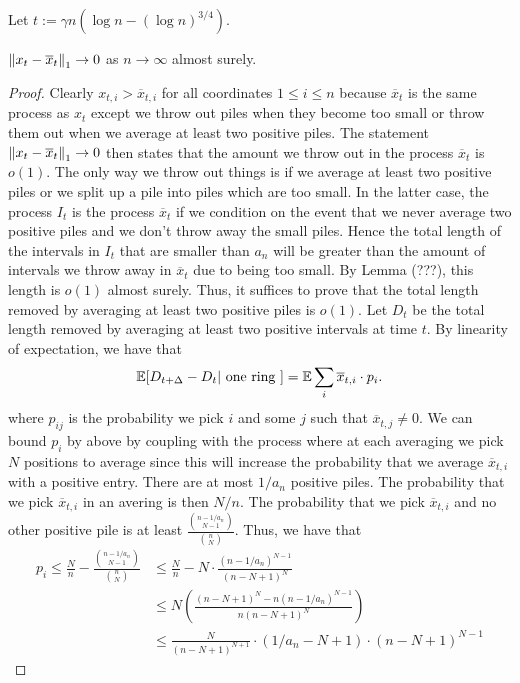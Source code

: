 \documentclass[12pt]{article}
\begin{document}
Let $t := \gamma n (\log n - (\log n)^{3/4})$. 
\begin{lem}
	$\left\lVert x_t - \overline{x}_t \right\rVert_1 \to 0$ as $n \to \infty$ almost surely. 
\end{lem}

\begin{proof}
	Clearly $x_{t, i} > \overline{x}_{t, i}$ for all coordinates $1 \leq i \leq n$ because $\overline{x}_{t}$ is the same process as $x_t$ except we throw out piles when they become too small or throw them out when we average at least two positive piles. The statement $\left\lVert x_t - \overline{x}_t \right\rVert_1 \to 0$ then states that the amount we throw out in the process $\overline{x}_t$ is $o(1)$. The only way we throw out things is if we average at least two positive piles or we split up a pile into piles which are too small. In the latter case, the process $I_t$ is the process $\overline{x}_t$ if we condition on the event that we never average two positive piles and we don't throw away the small piles. Hence the total length of the intervals in $I_t$ that are smaller than $a_n$ will be greater than the amount of intervals we throw away in $\overline{x}_t$ due to being too small. By Lemma (???), this length is $o(1)$ almost surely. Thus, it suffices to prove that the total length removed by averaging at least two positive piles is $o(1)$. Let $D_t$ be the total length removed by averaging at least two positive intervals at time $t$. By linearity of expectation, we have that 
	\[
		\mathbb{E} [ D_{t + \Delta} - D_t | \text{ one ring } ] = \mathbb{E} \sum_i \overline{x}_{t, i} \cdot p_{i}. 
	\]
	where $p_{ij}$ is the probability we pick $i$ and some $j$ such that $\overline{x}_{t, j} \neq 0$. We can bound $p_i$ by above by coupling with the process where at each averaging we pick $N$ positions to average since this will increase the probability that we average $\overline{x}_{t, i}$ with a positive entry. There are at most $1/a_n$ positive piles. The probability that we pick $\overline{x}_{t, i}$ in an avering is then $N / n$. The probability that we pick $\overline{x}_{t, i}$ and no other positive pile is at least $\frac{\binom{n - 1/a_n}{N-1}}{\binom{n}{N}}$. Thus, we have that
	\begin{align*}
		p_i \leq \frac{N}{n} - \frac{\binom{n-1/a_n}{N-1}}{\binom{n}{N}} & \leq \frac{N}{n} - N \cdot \frac{(n-1/a_n)^{N-1}}{(n-N+1)^N} \\
		& \leq N \left ( \frac{(n-N+1)^N - n(n-1/a_n)^{N-1}}{n(n-N+1)^N} \right ) \\
		& \leq \frac{N}{(n-N+1)^{N+1}} \cdot (1/a_n - N + 1) \cdot (n-N+1)^{N-1}

\end{align*}
\end{proof}
\end{document}
